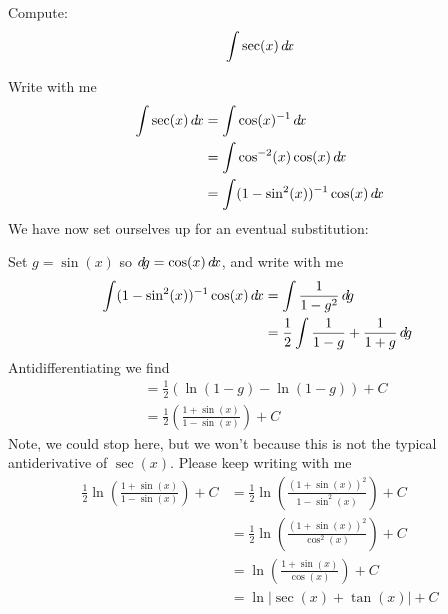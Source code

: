 \documentclass{ximera}
\begin{document}
\begin{example}
  Compute:
  \[
  \int \sec (x) \mathop{}\!d\! x
  \]
  \begin{explanation}
    Write with me
    \begin{align*}
      \int \sec(x) \d x &= \int \cos(x)^{-1} \d x\\
      &= \int \cos^{-2}(x)\cos(x) \d x\\
      &=\int(1-\sin^2(x))^{-1} \cos(x) \d x
    \end{align*}
    We have now set ourselves up for an eventual substitution:
    \begin{center}%
    \end{center}
    Set $g =\sin(x)$ so $\mathop{}\!d\! g = \cos(x) \mathop{}\!d\! x$, and write with me
    \begin{align*}
      \int(1-\sin^2(x))^{-1} \cos(x) \mathop{}\!d\! x &= \int \frac{1}{1-g^2}\mathop{}\!d\! g\\
      &= \frac{1}{2}\int \frac{1}{1-g} + \frac{1}{1+g} \mathop{}\!d\! g\
    \end{align*}
    Antidifferentiating we find
    \begin{align*}
      &=\frac{1}{2}\left(\ln(1-g) - \ln(1-g)\right)+C\\
      &= \frac{1}{2}\left(\frac{1+\sin(x)}{1-\sin(x)}\right)+C
    \end{align*}
    Note, we could stop here, but we won't because this is not the
    typical antiderivative of $\sec(x)$. Please keep writing with me
    \begin{align*}
      \frac{1}{2}\ln\left(\frac{1+\sin(x)}{1-\sin(x)}\right)+C &= \frac{1}{2}\ln\left(\frac{(1+\sin(x))^2}{1-\sin^2(x)}\right)+C \\
      &= \frac{1}{2}\ln\left(\frac{(1+\sin(x))^2}{\cos^2(x)}\right)+C \\
      &= \ln\left(\frac{1+\sin(x)}{\cos(x)}\right)+C \\
      &= \ln\left|\sec(x) + \tan(x)\right|+C \\
    \end{align*}
  \end{explanation}
\end{example}
\end{document}

